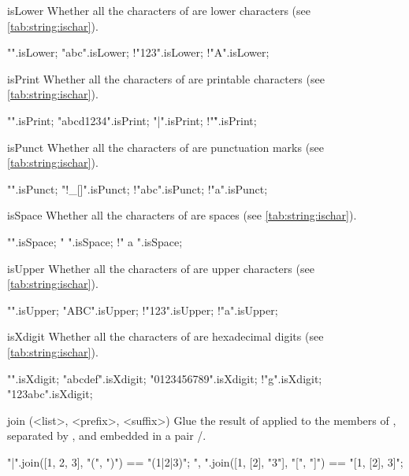 \begin{urbiscriptapi}
\item[isLower] Whether all the characters of \this are lower characters (see
  \autoref{tab:string:ischar}).
\begin{urbiassert}
          "".isLower;
       "abc".isLower;
      !"123".isLower;  !"A".isLower;
\end{urbiassert}


\item[isPrint] Whether all the characters of \this are printable characters
  (see \autoref{tab:string:ischar}).
\begin{urbiassert}
          "".isPrint;
  "abcd1234".isPrint;
       "{|}".isPrint; !"\r".isPrint;
\end{urbiassert}


\item[isPunct] Whether all the characters of \this are punctuation marks
  (see \autoref{tab:string:ischar}).
\begin{urbiassert}
         "".isPunct;
     "!_[]".isPunct;
     !"abc".isPunct;  !"a".isPunct;
\end{urbiassert}


\item[isSpace] Whether all the characters of \this are spaces (see
  \autoref{tab:string:ischar}).
\begin{urbiassert}
          "".isSpace;
       "   ".isSpace;
      !" a ".isSpace;
\end{urbiassert}


\item[isUpper] Whether all the characters of \this are upper characters (see
  \autoref{tab:string:ischar}).
\begin{urbiassert}
          "".isUpper;
       "ABC".isUpper;
      !"123".isUpper; !"a".isUpper;
\end{urbiassert}


\item[isXdigit] Whether all the characters of \this are hexadecimal digits
  (see \autoref{tab:string:ischar}).
\begin{urbiassert}
          "".isXdigit;
    "abcdef".isXdigit;
"0123456789".isXdigit;
        !"g".isXdigit; "123abc".isXdigit;
\end{urbiassert}


\item[join](<list>, <prefix>, <suffix>)%
  Glue the result of  applied to the members of
  , separated by \this, and embedded in a pair
  /.
\begin{urbiassert}
"|".join([1, 2, 3], "(", ")")      == "(1|2|3)";
", ".join([1, [2], "3"], "[", "]") == "[1, [2], 3]";
\end{urbiassert}



\end{urbiscriptapi}

